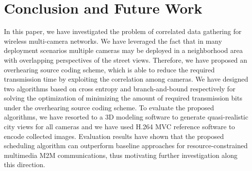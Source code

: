 \section{Conclusion and Future Work}
\label{sec::conclusion}
In this paper, we have investigated the problem of correlated data gathering for wireless multi-camera networks.
We have leveraged the fact that in many deployment scenarios multiple cameras may be deployed in a neighborhood area with overlapping perspectives of the street views.
Therefore, we have proposed an overhearing source coding scheme, which is able to reduce the required transmission time by exploiting the correlation among cameras. 
We have designed two algorithms based on cross entropy and branch-and-bound respectively for solving the optimization of minimizing the amount of required transmission bits under the overhearing source coding scheme.
To evaluate the proposed algorithms, we have resorted to a 3D modeling software to generate quasi-realistic city views for all cameras and we have used H.264 MVC reference software to encode collected images.
Evaluation results have shown that the proposed scheduling algorithm can outperform baseline approaches for resource-constrained multimedia M2M communications, thus motivating further investigation along this direction.